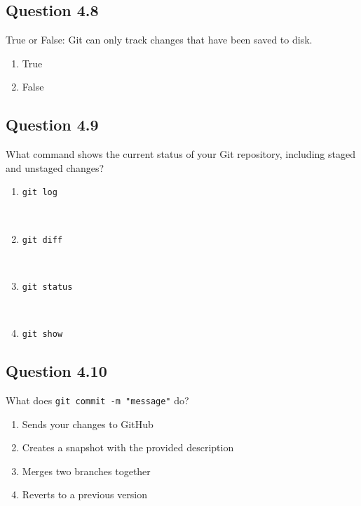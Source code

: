 \documentclass[
  letterpaper,
  DIV=11,
  numbers=noendperiod]{scrreprt}
\providecommand{\tightlist}{%
  \setlength{\itemsep}{0pt}\setlength{\parskip}{0pt}}
\begin{document}
\subsection{Question 4.8}\label{question-4.8}

True or False: Git can only track changes that have been saved to disk.

\begin{enumerate}
\def\labelenumi{\Alph{enumi})}
\tightlist
\item
  True\\
\item
  False
\end{enumerate}

\subsection{Question 4.9}\label{question-4.9}

What command shows the current status of your Git repository, including
staged and unstaged changes?

\begin{enumerate}
\def\labelenumi{\Alph{enumi})}
\tightlist
\item
  \texttt{git\ log}\strut \\
\item
  \texttt{git\ diff}\strut \\
\item
  \texttt{git\ status}\strut \\
\item
  \texttt{git\ show}
\end{enumerate}

\subsection{Question 4.10}\label{question-4.10}

What does \texttt{git\ commit\ -m\ "message"} do?

\begin{enumerate}
\def\labelenumi{\Alph{enumi})}
\tightlist
\item
  Sends your changes to GitHub\\
\item
  Creates a snapshot with the provided description\\
\item
  Merges two branches together\\
\item
  Reverts to a previous version
\end{enumerate}
\end{document}
